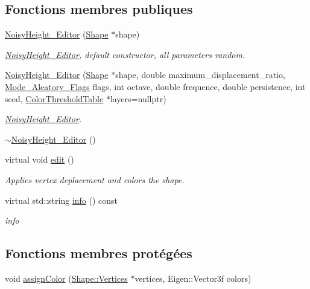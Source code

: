 \subsection*{Fonctions membres publiques}
\begin{DoxyCompactItemize}
\item 
\hyperlink{class_noisy_height___editor_ae4535fb17b29bd29d09dcadd5b9384e3}{Noisy\+Height\+\_\+\+Editor} (\hyperlink{class_shape}{Shape} $\ast$shape)
\begin{DoxyCompactList}\small\item\em \hyperlink{class_noisy_height___editor}{Noisy\+Height\+\_\+\+Editor}, default constructor, all parameters random. \end{DoxyCompactList}\item 
\hyperlink{class_noisy_height___editor_ac56426a50e5adf94c8b2a4211d0b0c77}{Noisy\+Height\+\_\+\+Editor} (\hyperlink{class_shape}{Shape} $\ast$shape, double maximum\+\_\+displacement\+\_\+ratio, \hyperlink{aleatorymode_8h_a8dc9582d5186e7d1ba17c0f21779d3d6}{Mode\+\_\+\+Aleatory\+\_\+\+Flags} flags, int octave, double frequence, double persistence, int seed, \hyperlink{thresholdtable_8h_ab0deb49d07758f9814993774cb9935cc}{Color\+Threshold\+Table} $\ast$layers=nullptr)
\begin{DoxyCompactList}\small\item\em \hyperlink{class_noisy_height___editor}{Noisy\+Height\+\_\+\+Editor}. \end{DoxyCompactList}\item 
\hyperlink{class_noisy_height___editor_afd295143a12d4d63773f69c1b5d1318b}{$\sim$\+Noisy\+Height\+\_\+\+Editor} ()
\item 
virtual void \hyperlink{class_noisy_height___editor_a3ed5c7267dec56ff2f21366ce2ae9818}{edit} ()
\begin{DoxyCompactList}\small\item\em Applies vertex deplacement and colors the shape. \end{DoxyCompactList}\item 
virtual std\+::string \hyperlink{class_noisy_height___editor_a4749fe8cb3306252a8f48c8147854578}{info} () const
\begin{DoxyCompactList}\small\item\em info \end{DoxyCompactList}\end{DoxyCompactItemize}
\subsection*{Fonctions membres protégées}
\begin{DoxyCompactItemize}
\item 
void \hyperlink{class_noisy_height___editor_a4cb46efb3183c7558f450368b962d3fc}{assign\+Color} (\hyperlink{struct_shape_1_1_vertices}{Shape\+::\+Vertices} $\ast$vertices, Eigen\+::\+Vector3f colors)
\end{DoxyCompactItemize}

